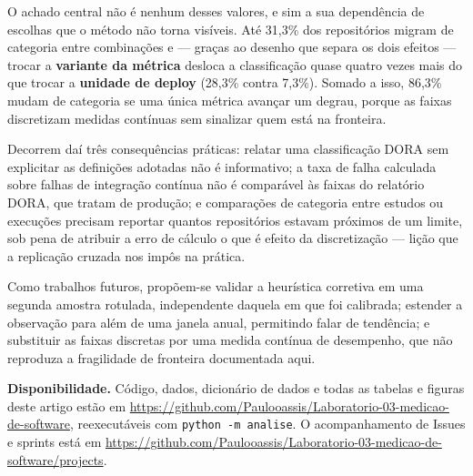 O achado central não é nenhum desses valores, e sim a sua dependência de escolhas que o
método não torna visíveis. Até 31,3\% dos repositórios migram de categoria entre combinações
e --- graças ao desenho que separa os dois efeitos --- trocar a \textbf{variante da métrica}
desloca a classificação quase quatro vezes mais do que trocar a \textbf{unidade de deploy}
(28,3\% contra 7,3\%). Somado a isso, 86,3\% mudam de categoria se uma única métrica avançar um
degrau, porque as faixas discretizam medidas contínuas sem sinalizar quem está na fronteira.

Decorrem daí três consequências práticas: relatar uma classificação DORA sem explicitar as
definições adotadas não é informativo; a taxa de falha calculada sobre falhas de integração contínua não é comparável às
faixas do relatório DORA, que tratam de produção; e comparações de categoria entre estudos ou
execuções precisam reportar quantos repositórios estavam próximos de um limite, sob pena de
atribuir a erro de cálculo o que é efeito da discretização --- lição que a replicação cruzada
nos impôs na prática.

Como trabalhos futuros, propõem-se validar a heurística corretiva em uma segunda amostra
rotulada, independente daquela em que foi calibrada; estender a observação para além de uma
janela anual, permitindo falar de tendência; e substituir as faixas discretas por uma medida
contínua de desempenho, que não reproduza a fragilidade de fronteira documentada aqui.

\vspace{0.2cm}
\noindent\textbf{Disponibilidade.} Código, dados, dicionário de dados e todas as tabelas e
figuras deste artigo estão em
\url{https://github.com/Paulooassis/Laboratorio-03-medicao-de-software}, reexecutáveis com
\texttt{python -m analise}. O acompanhamento de Issues e sprints está em
\url{https://github.com/Paulooassis/Laboratorio-03-medicao-de-software/projects}.


